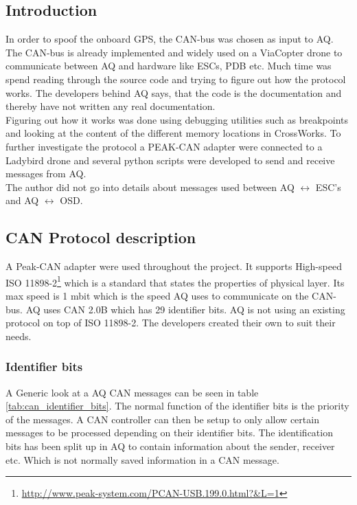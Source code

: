 \subsection{Introduction}
In order to spoof the onboard GPS, the CAN-bus was chosen as input to AQ. 
The CAN-bus is already implemented and widely used on a ViaCopter drone to communicate between AQ and hardware like ESCs, PDB etc. Much time was spend reading through the source code and trying to figure out how the protocol works.
The developers behind AQ says, that the code is the documentation and thereby have not written any real documentation. \\
Figuring out how it works was done using debugging utilities such as breakpoints and looking at the content of the different memory locations in CrossWorks.
To further investigate the protocol a PEAK-CAN adapter were connected to a Ladybird drone and several python scripts were developed to send and receive messages from AQ. \\
The author did not go into details about messages used between AQ $\leftrightarrow$ ESC's and AQ $\leftrightarrow$ OSD.\\


\subsection{CAN Protocol description}
A Peak-CAN adapter were used throughout the project. It supports High-speed ISO 11898-2\footnote{\url{http://www.peak-system.com/PCAN-USB.199.0.html?&L=1}} which is a standard that states the properties of physical layer. 
Its max speed is 1 mbit which is the speed AQ uses to communicate on the CAN-bus. 
AQ uses CAN 2.0B which has 29 identifier bits.
AQ is not using an existing protocol on top of ISO 11898-2. The developers created their own to suit their needs.\\

\subsubsection{Identifier bits}
A Generic look at a AQ CAN messages can be seen in table \ref{tab:can_identifier_bits}.
The normal function of the identifier bits is the priority of the messages.
A CAN controller can then be setup to only allow certain messages to be processed depending on their identifier bits.
The identification bits has been split up in AQ to contain information about the sender, receiver etc. Which is not normally saved information in a CAN message.


